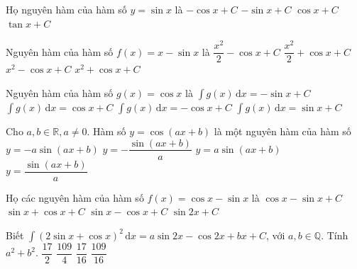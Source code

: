 \begin{ex}%
	Họ nguyên hàm của hàm số  $y=\sin x$ là
	\choice 
		{\True  $-\cos x+C$}
		{$-\sin x+C$} 
		{$\cos  x+C$}
		 {$\tan x+C$}
\end{ex}

\begin{ex}%
	Nguyên hàm  của hàm số $f(x)=x-\sin x$ là
	\choice 
		{$\dfrac{x^2}{2}-\cos x+C$} 
		{\True  $\dfrac{x^2}{2}+\cos x+C$}
		{$x^2-\cos  x+C$}
		{$x^2+\cos  x+C$}
\end{ex}

\begin{ex}%
	 Nguyên hàm của hàm số $g(x)=\cos x$ là
	 \choice
		{$\displaystyle\int g(x)\mathrm{\,d}x=-\sin  x+C$}
		{$\displaystyle\int g(x)\mathrm{\,d}x=\cos  x+C$}
		 {$\displaystyle\int g(x)\mathrm{\,d}x=-\cos x+C$}
		{\True $\displaystyle\int g(x)\mathrm{\,d}x=\sin x+C$} 
\end{ex}

\begin{ex}%
	Cho $a, b \in \mathbb{R},  a \neq 0$. Hàm số $y = \cos(ax+b)$ là một nguyên hàm của hàm số
	\choice 
		{\True $y = -a  \sin(ax+b)$}
		{$y = -\dfrac{\sin(ax+b)}{a}$} 
		 {$y = a \sin(ax+b)$}
		{$y =  \dfrac{\sin(ax+b)}{a}$}
\end{ex}

\begin{ex}%
	Họ các nguyên hàm của hàm số $f(x)=\cos  x-\sin x$ là
	 \choice
		{$\cos x-\sin x+C$} 
		 {\True $\sin x+\cos x+C$}
		 {$\sin x-\cos x+C$}
		 {$\sin2x+C$}
\end{ex}

\begin{ex}%
	 Biết $\displaystyle \int (2\sin x+\cos x)^2 \mathrm{\,d}x=a\sin 2x-\cos 2x+bx+C$, với $a, b\in \mathbb{Q}$. Tính $a^2+b^2$.
	 \choice
		{$\dfrac{17}{2}$} 
		 {$\dfrac{109}{4}$}
		 {$\dfrac{17}{16}$}
		{\True  $\dfrac{109}{16}$}
\end{ex}

